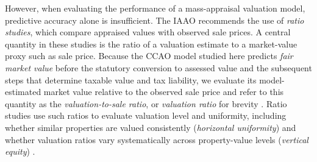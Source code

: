 \documentclass[10pt]{article}
\theoremstyle{definition}
\newcommand{\1}{\mathbf{1}}
\newcommand{\oldtext}[1]{\textcolor{blue}{\sout{#1}}}
\newcommand{\newtext}[1]{\textcolor{impGreen}{#1}}
\begin{document}
However, when evaluating the performance of a mass-appraisal valuation model, predictive accuracy alone is insufficient. The IAAO recommends the use of \emph{ratio studies}, which compare {appraised values} with observed sale prices. 
\newtext{A central quantity in these studies is the ratio of a valuation estimate to a market-value proxy such as sale price. Because the CCAO model studied here predicts \emph{fair market value} before the statutory conversion to assessed value and the subsequent steps that determine taxable value and tax liability, we evaluate its model-estimated market value relative to the observed sale price and refer to this quantity as the \emph{valuation-to-sale ratio}, or \emph{valuation ratio} for brevity \cite{CCAOModelResAVM2026,CCAOAssessmentNotice2026,CCAOPropertyTaxSystem2026}.} Ratio studies use such ratios to evaluate valuation level and uniformity, including whether similar properties are valued consistently (\emph{horizontal uniformity}) and whether valuation ratios vary systematically across property-value levels (\emph{vertical equity}) \cite{IAAO2013Ratio,IAAO2025Mass,IAAO2026ExposureRatio}.

\end{document}
